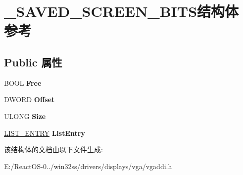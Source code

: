 \hypertarget{struct___s_a_v_e_d___s_c_r_e_e_n___b_i_t_s}{}\section{\+\_\+\+S\+A\+V\+E\+D\+\_\+\+S\+C\+R\+E\+E\+N\+\_\+\+B\+I\+T\+S结构体 参考}
\label{struct___s_a_v_e_d___s_c_r_e_e_n___b_i_t_s}
\subsection*{Public 属性}
\begin{DoxyCompactItemize}
\item 
\mbox{\label{struct___s_a_v_e_d___s_c_r_e_e_n___b_i_t_s_abd9b972f12a7f965ceb056cb6ad4d486}} 
B\+O\+OL {\bfseries Free}
\item 
\mbox{\label{struct___s_a_v_e_d___s_c_r_e_e_n___b_i_t_s_a6c1fed4c40bbf6c1b9d8052347dd14f7}} 
D\+W\+O\+RD {\bfseries Offset}
\item 
\mbox{\label{struct___s_a_v_e_d___s_c_r_e_e_n___b_i_t_s_ab9d36504772050193813dd768f65a212}} 
U\+L\+O\+NG {\bfseries Size}
\item 
\mbox{\label{struct___s_a_v_e_d___s_c_r_e_e_n___b_i_t_s_afb8eb60a85eba0d42aeeb9696b5eca87}} 
\hyperlink{struct___l_i_s_t___e_n_t_r_y}{L\+I\+S\+T\+\_\+\+E\+N\+T\+RY} {\bfseries List\+Entry}
\end{DoxyCompactItemize}


该结构体的文档由以下文件生成\+:\begin{DoxyCompactItemize}
\item 
E\+:/\+React\+O\+S-\/0../win32ss/drivers/displays/vga/vgaddi.\+h\end{DoxyCompactItemize}
